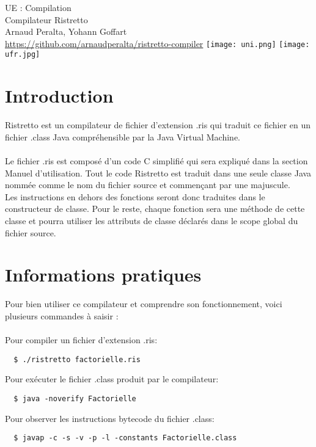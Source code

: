 \documentclass[12pt]{report}
\begin{document}
\begin{titlepage}
    \centering
    \hspace{0pt}
    \vfill
    {\LARGE UE : Compilation\\Compilateur Ristretto\\}
    \vspace{1cm}
    {\large Arnaud Peralta, Yohann Goffart\\}
    \vspace{3cm}
    {\large \href{https://github.com/arnaudperalta/ristretto-compiler}{https://github.com/arnaudperalta/ristretto-compiler}}
    \vfill
    \texttt{[image: uni.png]}
    \hspace{2 cm}
    \texttt{[image: ufr.jpg]}
\end{titlepage}
\renewcommand{\contentsname}{Sommaire}
\doublespacing
\tableofcontents
\thispagestyle{empty}
\newpage
\cfoot{\raisebox{20\height}{\thepage}}
\singlespacing
{}
\section{Introduction}
Ristretto est un compilateur de fichier d'extension .ris qui traduit ce fichier en un fichier .class Java compréhensible par la Java Virtual Machine.\\\\
Le fichier .ris est composé d'un code C simplifié qui sera expliqué dans la section Manuel d'utilisation. Tout le code Ristretto est traduit dans une seule classe Java nommée comme le nom du fichier source et commençant par une majuscule.\\
Les instructions en dehors des fonctions seront donc traduites dans le constructeur de classe. Pour le reste, chaque fonction sera une méthode de cette classe et pourra utiliser les attributs de classe déclarés dans le scope global du fichier source.
\section{Informations pratiques}
Pour bien utiliser ce compilateur et comprendre son fonctionnement, voici plusieurs commandes à saisir :\\\\
Pour compiler un fichier d'extension .ris:
\begin{verbatim}
  $ ./ristretto factorielle.ris
\end{verbatim}
Pour exécuter le fichier .class produit par le compilateur:
\begin{verbatim}
  $ java -noverify Factorielle
\end{verbatim}
Pour observer les instructions bytecode du fichier .class:
\begin{verbatim}
  $ javap -c -s -v -p -l -constants Factorielle.class
\end{verbatim}
\newpage
{}
\end{document}

